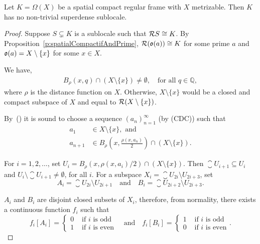 \begin{theorem}
    Let $K = \Omega(X)$ be a spatial compact regular frame with $X$ metrizable. Then $K$ has no non-trivial superdense sublocale.
\end{theorem}
\begin{proof}
    Suppose $S\subsetneq K$ is a sublocale such that $\mathcal{R} S\cong K$. By Proposition~\ref{p:spatialCompactifAndPrime}, $\mathcal{R}(\mathfrak{o}(a))\cong K$ for some prime $a$ and $\mathfrak{o}(a) = X\setminus \{x\}$ for some $x\in X$.

    We have,
    \begin{align}
        B_\rho(x, q)\cap (X\setminus \{x\}) \neq \emptyset,\quad\text{for all } q\in \mathbb{Q},\label{e:ballsIntersect}
    \end{align}
    where $\rho$ is the distance function on $X$. Otherwise, $X\setminus \{x\}$ would be a closed and compact subspace of $X$ and equal to $\mathcal{R}(X\setminus \{x\})$.

    By~() it is sound to choose a sequence $(a_n)_{n=1}^\infty$ (by (CDC)) such that
    \begin{align*}
        a_1 &\in X\setminus \{x\},\text{ and} \\
        a_{n+1} &\in B_\rho\left(x, \frac{\rho(x,a_n)}{2}\right)\cap (X\setminus \{x\}).
    \end{align*}

    \noindent For $i = 1,2,\dots$, set $U_i = B_\rho(x,\rho(x,a_i)/2)\cap (X\setminus \{x\})$. Then $\closure{U}_{i+1}\subseteq U_i$ and $U_i\setminus \closure{U}_{i+1} \neq \emptyset$, for all $i$.
    For a subspace $X_i = \closure{U}_{2i}\setminus U_{2i+3}$, set
    $$ A_i = \closure{U}_{2i}\setminus U_{2i+1}\quad\text{and}\quad B_i = \closure{U}_{2i+2}\setminus U_{2i+3}. $$

    \noindent $A_i$ and $B_i$ are disjoint closed subsets of $X_i$, therefore, from normality, there exists a continuous function $f_i$ such that
    $$ f_i[A_i] = \begin{cases} 0 & \text{ if }i\text{ is odd} \\ 1 & \text{ if }i\text{ is even}\end{cases}
       \quad\text{and}\quad
       f_i[B_i] = \begin{cases} 1 & \text{ if }i\text{ is odd} \\ 0 & \text{ if }i\text{ is even}\end{cases}. $$


\end{proof}
